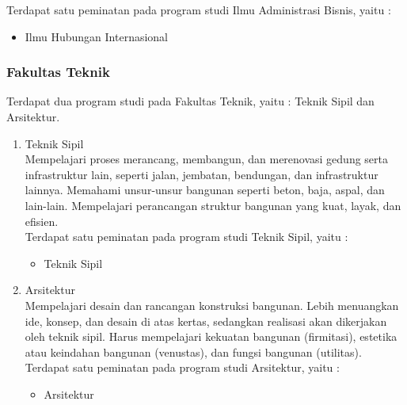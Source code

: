 \begin{enumerate}
			Terdapat satu peminatan pada program studi Ilmu Administrasi Bisnis, yaitu :
			
			\begin{itemize}
				\item Ilmu Hubungan Internasional
			\end{itemize}\leavevmode

	\end{enumerate}\leavevmode
	
\subsubsection{Fakultas Teknik}
Terdapat dua program studi pada Fakultas Teknik, yaitu : Teknik Sipil dan Arsitektur.
	\begin{enumerate}
		\item Teknik Sipil\\
			 Mempelajari proses merancang, membangun, dan merenovasi gedung serta infrastruktur lain, seperti jalan, jembatan, bendungan, dan infrastruktur lainnya. Memahami unsur-unsur bangunan seperti beton, baja, aspal, dan lain-lain. Mempelajari perancangan struktur bangunan yang kuat, layak, dan efisien.\\
			
			Terdapat satu peminatan pada program studi Teknik Sipil, yaitu :
			
			\begin{itemize}
				\item Teknik Sipil
			\end{itemize}\leavevmode
			
		\item Arsitektur\\
			Mempelajari desain dan rancangan konstruksi bangunan. Lebih menuangkan ide, konsep, dan desain di atas kertas, sedangkan realisasi akan dikerjakan oleh teknik sipil. Harus mempelajari kekuatan bangunan (firmitasi), estetika atau keindahan bangunan (venustas), dan fungsi bangunan (utilitas). \\
			
			Terdapat satu peminatan pada program studi Arsitektur, yaitu :
			
			\begin{itemize}
				\item Arsitektur
			\end{itemize}\leavevmode

	\end{enumerate}\leavevmode
	
